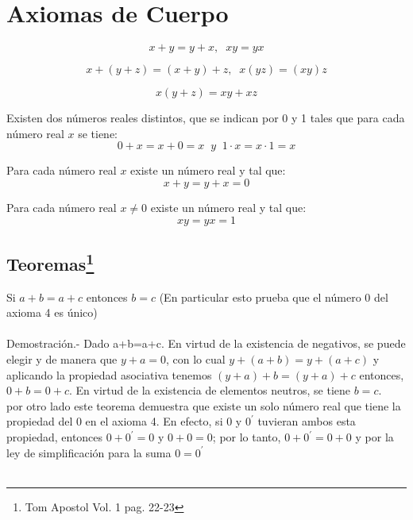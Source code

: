 
\chapter{Axiomas de Cuerpo}
\begin{center}
\begin{tcolorbox}
\begin{axioma}
$$x+y = y+x, \; \; xy=yx$$
\end{axioma}

\begin{axioma}
$$x+(y+z)=(x+y)+z, \; \; x(yz) = (xy)z $$
\end{axioma}

\begin{axioma}
$$x(y+z)=xy+xz$$
\end{axioma}

\begin{axioma}
Existen dos números reales distintos, que se indican por 0 y 1 tales que para cada número real $x$ se tiene:
$$0+x = x+0=x \; \; y \; \; 1\cdot x = x\cdot 1 = x$$
\end{axioma}

\begin{axioma}
Para cada número real $x$ existe un número real y tal que:
$$x+y=y+x=0$$
\end{axioma}

\begin{axioma}
Para cada número real $x\neq 0$ existe un número real y tal que:
$$xy = yx = 1$$
\end{axioma}
\end{tcolorbox}
\end{center}


\section[Teoremas]{Teoremas\footnote{Tom Apostol Vol. 1 pag. 22-23}} 
\begin{teo}
Si $a+b=a+c$ entonces $b=c$ (En particular esto prueba que el número 0 del axioma 4 es único)\\\\
Demostración.- \;
Dado a+b=a+c. En virtud de la existencia de negativos, se puede elegir y de manera que $y+a=0$, con lo cual $y+(a+b)=y+(a+c)$ y aplicando la propiedad asociativa tenemos $(y+a)+b=(y+a)+c$ entonces, $0+b=0+c$. En virtud de la existencia de elementos neutros, se tiene $b=c$.\\
por otro lado este teorema demuestra que existe un solo número real que tiene la propiedad del 0 en el axioma 4. En efecto, si $0$ y $0^{'}$ tuvieran ambos esta propiedad, entonces $0+0^{'}=0$ y $0+0=0$; por lo tanto, $0+0^{'}=0+0$ y por la ley de simplificación para la suma $0=0^{'}$\\\\
\end{teo}

